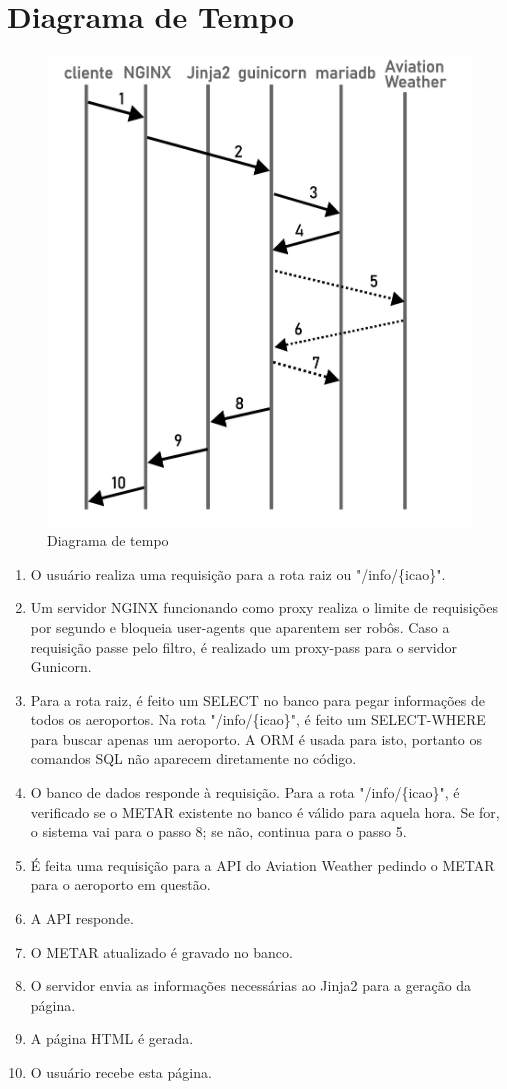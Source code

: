 \section{Diagrama de Tempo}

\begin{figure}[ht]
    \begin{center}
    \includegraphics[width=0.5\linewidth]{img/diagrama-tempo.png}
    \caption{Diagrama de tempo}
    \label{fig:tempo}
    \end{center}
\end{figure}

\begin{enumerate}
\item O usuário realiza uma requisição para a rota raiz ou "/info/\{icao\}".
\item Um servidor NGINX funcionando como proxy realiza o limite de requisições por segundo
e bloqueia user-agents que aparentem ser robôs. Caso a requisição passe pelo filtro, é
realizado um proxy-pass para o servidor Gunicorn.
\item Para a rota raiz, é feito um SELECT no banco para pegar informações de todos os
aeroportos. Na rota "/info/\{icao\}", é feito um SELECT-WHERE para buscar apenas um aeroporto.
A ORM é usada para isto, portanto os comandos SQL não aparecem diretamente no código.
\item O banco de dados responde à requisição. Para a rota "/info/\{icao\}", é verificado 
se o METAR existente no banco é válido para aquela hora. Se for, o sistema vai para o passo 8;
se não, continua para o passo 5.
\item É feita uma requisição para a API do Aviation Weather pedindo o METAR para o 
aeroporto em questão.
\item A API responde.
\item O METAR atualizado é gravado no banco.
\item O servidor envia as informações necessárias ao Jinja2 para a geração da página.
\item A página HTML é gerada.
\item O usuário recebe esta página.
\end{enumerate}
